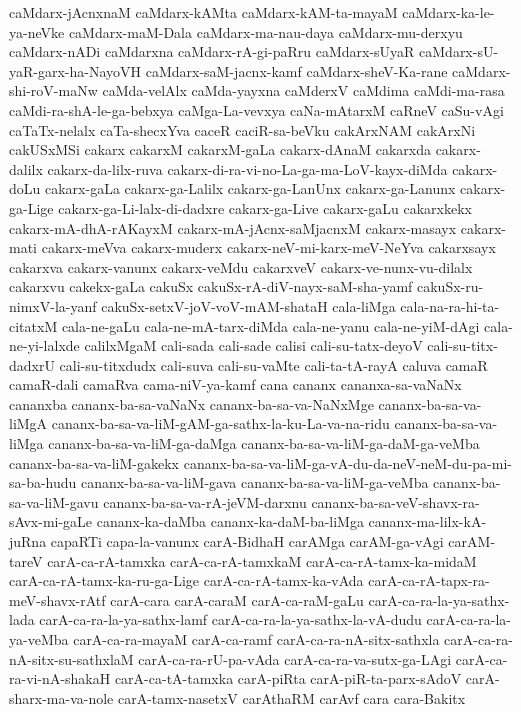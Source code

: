 {caMdarx-jAcnxnaM
caMdarx-kAMta
caMdarx-kAM-ta-mayaM
caMdarx-ka-le-ya-neVke
caMdarx-maM-Dala
caMdarx-ma-nau-daya
caMdarx-mu-derxyu
caMdarx-nADi
caMdarxna
caMdarx-rA-gi-paRru
caMdarx-sUyaR
caMdarx-sU-yaR-garx-ha-NayoVH
caMdarx-saM-jacnx-kamf
caMdarx-sheV-Ka-rane
caMdarx-shi-roV-maNw
caMda-velAlx
caMda-yayxna
caMderxV
caMdima
caMdi-ma-rasa
caMdi-ra-shA-le-ga-bebxya
caMga-La-vevxya
caNa-mAtarxM
caRneV
caSu-vAgi
caTaTx-nelalx
caTa-shecxYva
caceR
caciR-sa-beVku
cakArxNAM
cakArxNi
cakUSxMSi
cakarx
cakarxM
cakarxM-gaLa
cakarx-dAnaM
cakarxda
cakarx-dalilx
cakarx-da-lilx-ruva
cakarx-di-ra-vi-no-La-ga-ma-LoV-kayx-diMda
cakarx-doLu
cakarx-gaLa
cakarx-ga-Lalilx
cakarx-ga-LanUnx
cakarx-ga-Lanunx
cakarx-ga-Lige
cakarx-ga-Li-lalx-di-dadxre
cakarx-ga-Live
cakarx-gaLu
cakarxkekx
cakarx-mA-dhA-rAKayxM
cakarx-mA-jAcnx-saMjacnxM
cakarx-masayx
cakarx-mati
cakarx-meVva
cakarx-muderx
cakarx-neV-mi-karx-meV-NeYva
cakarxsayx
cakarxva
cakarx-vanunx
cakarx-veMdu
cakarxveV
cakarx-ve-nunx-vu-dilalx
cakarxvu
cakekx-gaLa
cakuSx
cakuSx-rA-diV-nayx-saM-sha-yamf
cakuSx-ru-nimxV-la-yanf
cakuSx-setxV-joV-voV-mAM-shataH
cala-liMga
cala-na-ra-hi-ta-citatxM
cala-ne-gaLu
cala-ne-mA-tarx-diMda
cala-ne-yanu
cala-ne-yiM-dAgi
cala-ne-yi-lalxde
calilxMgaM
cali-sada
cali-sade
calisi
cali-su-tatx-deyoV
cali-su-titx-dadxrU
cali-su-titxdudx
cali-suva
cali-su-vaMte
cali-ta-tA-rayA
caluva
camaR
camaR-dali
camaRva
cama-niV-ya-kamf
cana
cananx
cananxa-sa-vaNaNx
cananxba
cananx-ba-sa-vaNaNx
cananx-ba-sa-va-NaNxMge
cananx-ba-sa-va-liMgA
cananx-ba-sa-va-liM-gAM-ga-sathx-la-ku-La-va-na-ridu
cananx-ba-sa-va-liMga
cananx-ba-sa-va-liM-ga-daMga
cananx-ba-sa-va-liM-ga-daM-ga-veMba
cananx-ba-sa-va-liM-gakekx
cananx-ba-sa-va-liM-ga-vA-du-da-neV-neM-du-pa-mi-sa-ba-hudu
cananx-ba-sa-va-liM-gava
cananx-ba-sa-va-liM-ga-veMba
cananx-ba-sa-va-liM-gavu
cananx-ba-sa-va-rA-jeVM-darxnu
cananx-ba-sa-veV-shavx-ra-sAvx-mi-gaLe
cananx-ka-daMba
cananx-ka-daM-ba-liMga
cananx-ma-lilx-kA-juRna
capaRTi
capa-la-vanunx
carA-BidhaH
carAMga
carAM-ga-vAgi
carAM-tareV
carA-ca-rA-tamxka
carA-ca-rA-tamxkaM
carA-ca-rA-tamx-ka-midaM
carA-ca-rA-tamx-ka-ru-ga-Lige
carA-ca-rA-tamx-ka-vAda
carA-ca-rA-tapx-ra-meV-shavx-rAtf
carA-cara
carA-caraM
carA-ca-raM-gaLu
carA-ca-ra-la-ya-sathx-lada
carA-ca-ra-la-ya-sathx-lamf
carA-ca-ra-la-ya-sathx-la-vA-dudu
carA-ca-ra-la-ya-veMba
carA-ca-ra-mayaM
carA-ca-ramf
carA-ca-ra-nA-sitx-sathxla
carA-ca-ra-nA-sitx-su-sathxlaM
carA-ca-ra-rU-pa-vAda
carA-ca-ra-va-sutx-ga-LAgi
carA-ca-ra-vi-nA-shakaH
carA-ca-tA-tamxka
carA-piRta
carA-piR-ta-parx-sAdoV
carA-sharx-ma-va-nole
carA-tamx-nasetxV
carAthaRM
carAvf
cara
cara-Bakitx
}
